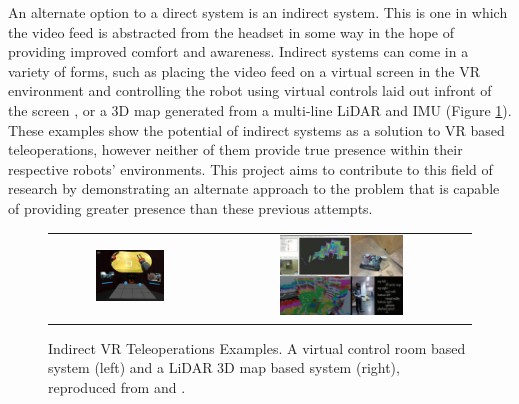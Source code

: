 An alternate option to a direct system is an indirect system. This is one in which the video feed is abstracted from the headset in some way in the hope of providing improved comfort and awareness. Indirect systems can come in a variety of forms, such as placing the video feed on a virtual screen in the VR environment and controlling the robot using virtual controls laid out infront of the screen \cite{lipton2018baxter}, or a 3D map generated from a multi-line LiDAR and IMU \cite{wang2017novel} (Figure \ref{fig:VRTele}). These examples show the potential of indirect systems as a solution to VR based teleoperations, however neither of them provide true presence within their respective robots' environments. This project aims to contribute to this field of research by demonstrating an alternate approach to the problem that is capable of providing greater presence than these previous attempts.

\begin{figure}[H]
    \begin{center}
    \begin{tabular}{ c c }
        \includegraphics[width=0.45\textwidth]{Figures/homun.png} &
        \includegraphics[width=0.5\textwidth]{Figures/lidar.png}
    \end{tabular}
    \caption[Indirect VR Teleoperations Examples]{Indirect VR Teleoperations Examples. A virtual control room based system (left) and a LiDAR 3D map based system (right), reproduced from \cite{lipton2018baxter} and \cite{wang2017novel}.}
    \label{fig:VRTele}
    \end{center}
\end{figure}

